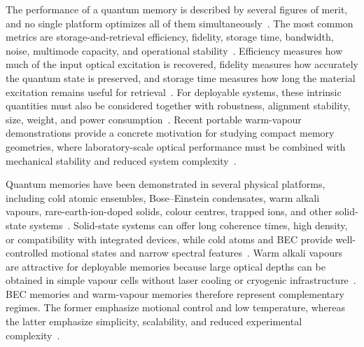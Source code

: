 The performance of a quantum memory is described by several figures of merit, and no single platform optimizes all of them simultaneously~\cite{AWAVQMitCoSR_Rodriguez_,Qmeaara_HeshamiEtAl_2016}. The most common metrics are storage-and-retrieval efficiency, fidelity, storage time, bandwidth, noise, multimode capacity, and operational stability~\cite{Qmeaara_HeshamiEtAl_2016,Smqms_JutiszEtAl_2025,AWAVQMitCoSR_Rodriguez_}. Efficiency measures how much of the input optical excitation is recovered, fidelity measures how accurately the quantum state is preserved, and storage time measures how long the material excitation remains useful for retrieval~\cite{Qmeaara_HeshamiEtAl_2016,AWAVQMitCoSR_Rodriguez_}. For deployable systems, these intrinsic quantities must also be considered together with robustness, alignment stability, size, weight, and power consumption~\cite{Smqms_JutiszEtAl_2025}. Recent portable warm-vapour demonstrations provide a concrete motivation for studying compact memory geometries, where laboratory-scale optical performance must be combined with mechanical stability and reduced system complexity~\cite{Smqms_JutiszEtAl_2025}.

Quantum memories have been demonstrated in several physical platforms, including cold atomic ensembles, Bose--Einstein condensates, warm alkali vapours, rare-earth-ion-doped solids, colour centres, trapped ions, and other solid-state systems~\cite{Qmeaara_HeshamiEtAl_2016,Smqms_JutiszEtAl_2025,AWAVQMitCoSR_Rodriguez_}. Solid-state systems can offer long coherence times, high density, or compatibility with integrated devices, while cold atoms and BEC provide well-controlled motional states and narrow spectral features~\cite{Qmeaara_HeshamiEtAl_2016,AWAVQMitCoSR_Rodriguez_}. Warm alkali vapours are attractive for deployable memories because large optical depths can be obtained in simple vapour cells without laser cooling or cryogenic infrastructure~\cite{Smqms_JutiszEtAl_2025}. BEC memories and warm-vapour memories therefore represent complementary regimes. The former emphasize motional control and low temperature, whereas the latter emphasize simplicity, scalability, and reduced experimental complexity~\cite{Qmeaara_HeshamiEtAl_2016,Smqms_JutiszEtAl_2025}.

